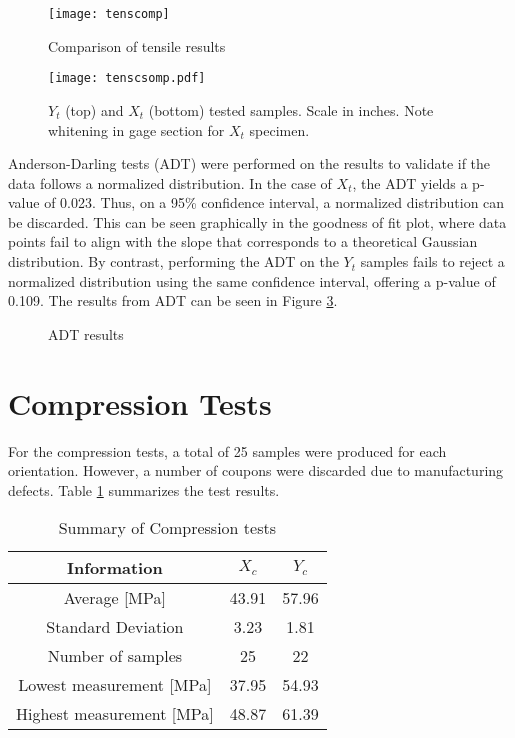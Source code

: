 \documentclass[main.tex]{subfiles}
\begin{document}
\begin{figure}[h]
	\center
	\texttt{[image: tenscomp]}
	\caption{Comparison of tensile results} \label{fig:tensComp}
\end{figure}

\begin{figure}[!htbp]
	\center
	\texttt{[image: tenscsomp.pdf]}
	\captionsetup{justification=centering} %
	\caption[$X_t$ and $Y_t$ tested samples]{$Y_t$ (top) and $X_t$ (bottom) tested samples. Scale in inches. Note whitening in gage section for $X_t$ specimen.} \label{fig:tensSComp}
\end{figure}

Anderson-Darling tests (ADT) were performed on the results to validate if the data follows a normalized distribution. In the case of $X_t$, the ADT yields a p-value of 0.023. Thus, on a 95\% confidence interval, a normalized distribution can be discarded. This can be seen graphically in the goodness of fit plot, where data points fail to align with the slope that corresponds to a theoretical Gaussian distribution. By contrast, performing the ADT on the $Y_t$ samples fails to reject a normalized distribution using the same confidence interval, offering a p-value of 0.109. %
The results from ADT can be seen in Figure \ref{fig:adttens}.

\begin{figure}[!htbp]
	\center
	\hfill
	\caption{ADT results} \label{fig:adttens}
\end{figure}
      
\section{Compression Tests} \label{sec:compr}
For the compression tests, a total of 25 samples were produced for each orientation. However, a number of coupons were discarded due to manufacturing defects. Table \ref{tab:comprtab} summarizes the test results.  

\begin{table} [h]
	\centering
	\caption{Summary of Compression tests}%
	\begin{tabular}{ c| c c } 
		\toprule
		\textbf{Information} & $X_c$ & $Y_c$\\
		\midrule
		Average [MPa] &43.91  & 57.96\\
		Standard Deviation &3.23  & 1.81\\
		Number of samples &25  & 22\\
		Lowest measurement [MPa] &37.95 &54.93 \\
		Highest measurement [MPa] &48.87 &61.39 \\
		\bottomrule
	\end{tabular}
\label{tab:comprtab}
\end{table}
\end{document}
